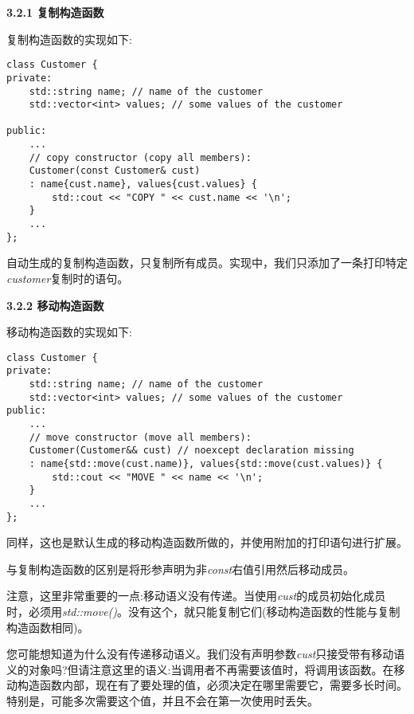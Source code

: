 \hspace*{\fill} \par %
\textbf{3.2.1 复制构造函数}

复制构造函数的实现如下:\par

\begin{lstlisting}[caption={}]
class Customer {
private:
	std::string name; // name of the customer
	std::vector<int> values; // some values of the customer
	
public:
	...
	// copy constructor (copy all members):
	Customer(const Customer& cust)
	: name{cust.name}, values{cust.values} {
		std::cout << "COPY " << cust.name << '\n';
	}
	...
};
\end{lstlisting}

自动生成的复制构造函数，只复制所有成员。实现中，我们只添加了一条打印特定\textit{customer}复制时的语句。\par

\hspace*{\fill} \par %
\textbf{3.2.2 移动构造函数}

移动构造函数的实现如下:\par

\begin{lstlisting}[caption={}]
class Customer {
private:
	std::string name; // name of the customer
	std::vector<int> values; // some values of the customer
public:
	...
	// move constructor (move all members):
	Customer(Customer&& cust) // noexcept declaration missing
	: name{std::move(cust.name)}, values{std::move(cust.values)} {
		std::cout << "MOVE " << name << '\n';
	}
	...
};
\end{lstlisting}

同样，这也是默认生成的移动构造函数所做的，并使用附加的打印语句进行扩展。\par

与复制构造函数的区别是将形参声明为非\textit{const}右值引用然后移动成员。\par

注意，这里非常重要的一点:移动语义没有传递。当使用\textit{cust}的成员初始化成员时，必须用\textit{std::move()}。没有这个，就只能复制它们(移动构造函数的性能与复制构造函数相同)。\par

您可能想知道为什么没有传递移动语义。我们没有声明参数\textit{cust}只接受带有移动语义的对象吗?但请注意这里的语义:当调用者不再需要该值时，将调用该函数。在移动构造函数内部，现在有了要处理的值，必须决定在哪里需要它，需要多长时间。特别是，可能多次需要这个值，并且不会在第一次使用时丢失。\par

